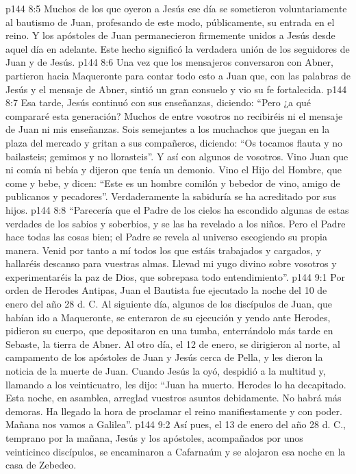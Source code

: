 \vs p144 8:5 Muchos de los que oyeron a Jesús ese día se sometieron voluntariamente al bautismo de Juan, profesando de este modo, públicamente, su entrada en el reino. Y los apóstoles de Juan permanecieron firmemente unidos a Jesús desde aquel día en adelante. Este hecho significó la verdadera unión de los seguidores de Juan y de Jesús.
\vs p144 8:6 Una vez que los mensajeros conversaron con Abner, partieron hacia Maqueronte para contar todo esto a Juan que, con las palabras de Jesús y el mensaje de Abner, sintió un gran consuelo y vio su fe fortalecida.
\vs p144 8:7 Esa tarde, Jesús continuó con sus enseñanzas, diciendo: “Pero ¿a qué compararé esta generación? Muchos de entre vosotros no recibiréis ni el mensaje de Juan ni mis enseñanzas. Sois semejantes a los muchachos que juegan en la plaza del mercado y gritan a sus compañeros, diciendo: “Os tocamos flauta y no bailasteis; gemimos y no llorasteis”. Y así con algunos de vosotros. Vino Juan que ni comía ni bebía y dijeron que tenía un demonio. Vino el Hijo del Hombre, que come y bebe, y dicen: “Este es un hombre comilón y bebedor de vino, amigo de publicanos y pecadores”. Verdaderamente la sabiduría se ha acreditado por sus hijos.
\vs p144 8:8 “Parecería que el Padre de los cielos ha escondido algunas de estas verdades de los sabios y soberbios, y se las ha revelado a los niños. Pero el Padre hace todas las cosas bien; el Padre se revela al universo escogiendo su propia manera. Venid por tanto a mí todos los que estáis trabajados y cargados, y hallaréis descanso para vuestras almas. Llevad mi yugo divino sobre vosotros y experimentaréis la paz de Dios, que sobrepasa todo entendimiento”.
\vs p144 9:1 Por orden de Herodes Antipas, Juan el Bautista fue ejecutado la noche del 10 de enero del año 28 d. C. Al siguiente día, algunos de los discípulos de Juan, que habían ido a Maqueronte, se enteraron de su ejecución y yendo ante Herodes, pidieron su cuerpo, que depositaron en una tumba, enterrándolo más tarde en Sebaste, la tierra de Abner. Al otro día, el 12 de enero, se dirigieron al norte, al campamento de los apóstoles de Juan y Jesús cerca de Pella, y les dieron la noticia de la muerte de Juan. Cuando Jesús la oyó, despidió a la multitud y, llamando a los veinticuatro, les dijo: “Juan ha muerto. Herodes lo ha decapitado. Esta noche, en asamblea, arreglad vuestros asuntos debidamente. No habrá más demoras. Ha llegado la hora de proclamar el reino manifiestamente y con poder. Mañana nos vamos a Galilea”.
\vs p144 9:2 Así pues, el 13 de enero del año 28 d. C., temprano por la mañana, Jesús y los apóstoles, acompañados por unos veinticinco discípulos, se encaminaron a Cafarnaúm y se alojaron esa noche en la casa de Zebedeo.
